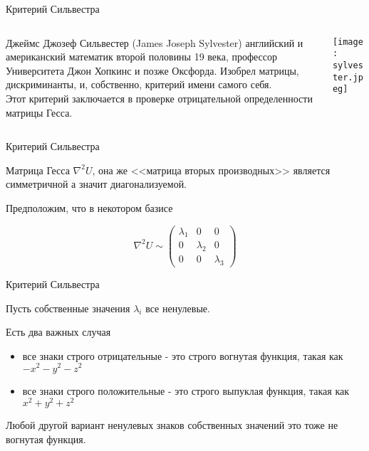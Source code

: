 \documentclass{beamer}
\begin{document}
\begin{frame}{Критерий Сильвестра}

\begin{columns}
\begin{column}{0.5\textwidth}
   \alert{Джеймс Джозеф Сильвестер} (James Joseph Sylvester) английский и американский математик второй половины 19 века, профессор Университета Джон Хопкинс и позже Оксфорда. Изобрел матрицы, дискриминанты, и, собственно, критерий имени самого себя. \\ Этот критерий заключается в проверке отрицательной определенности матрицы Гесса.
\end{column}
\begin{column}{0.5\textwidth}  %
    \begin{center}
     \texttt{[image: sylvester.jpeg]}
     \end{center}
\end{column}
\end{columns}

\end{frame}

\begin{frame}{Критерий Сильвестра}

Матрица Гесса $\nabla^2 U$, она же <<матрица вторых производных>> является симметричной а значит диагонализуемой.

Предположим, что в некотором базисе 

$$\nabla^2 U \sim \begin{pmatrix}
  \lambda_1 & 0 & 0 \\
  0 & \lambda_2 & 0 \\
  0 & 0 & \lambda_3
\end{pmatrix}$$

\end{frame}

\begin{frame}{Критерий Сильвестра}

Пусть собственные значения $\lambda_i$ все ненулевые.

Есть два важных случая

\begin{itemize}
  \item все знаки строго отрицательные - это \alert{строго вогнутая} функция, такая как $-x^2-y^2-z^2$
  \item все знаки строго положительные - это \alert{строго выпуклая} функция, такая как $x^2+y^2+z^2$
\end{itemize}

Любой другой вариант ненулевых знаков собственных значений это тоже не вогнутая функция.

\end{frame}
\end{document}
